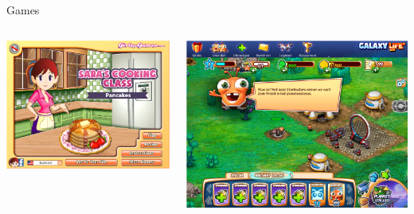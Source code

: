 \documentclass[aspectratio=169]{beamer}
\begin{document}
\begin{frame}{Games}
    \begin{columns}
        \begin{column}[c]{0.5\textwidth}
            \includegraphics[height=0.6\textheight]{images/sarah.png}
        \end{column}
        \begin{column}[c]{0.5\textwidth}
            \includegraphics[height=0.6\textheight]{images/galaxylife.png}
        \end{column}
    \end{columns}
\end{frame}
\end{document}
